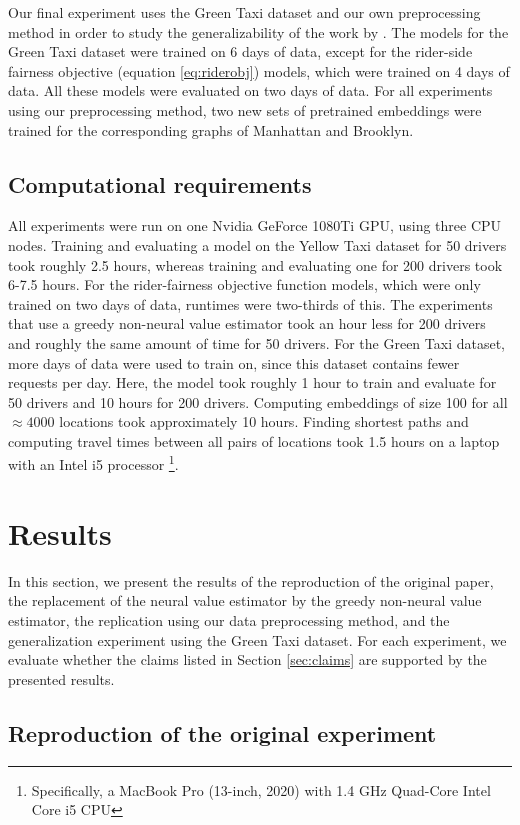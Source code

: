 Our final experiment uses the Green Taxi dataset and our own preprocessing method in order to study the generalizability of the work by \cite{raman_data-driven_2021}. The models for the Green Taxi dataset were trained on 6 days of data, except for the rider-side fairness objective (equation \ref{eq:riderobj}) models, which were trained on 4 days of data. All these models were evaluated on two days of data. For all experiments using our preprocessing method, two new sets of pretrained embeddings were trained for the corresponding graphs of Manhattan and Brooklyn.

\subsection{Computational requirements}
All experiments were run on one Nvidia GeForce 1080Ti GPU, using three CPU nodes. Training and evaluating a model on the Yellow Taxi dataset for 50 drivers took roughly 2.5 hours, whereas training and evaluating one for 200 drivers took 6-7.5 hours. For the rider-fairness objective function models, which were only trained on two days of data, runtimes were two-thirds of this. The experiments that use a greedy non-neural value estimator took an hour less for 200 drivers and roughly the same amount of time for 50 drivers. For the Green Taxi dataset, more days of data were used to train on, since this dataset contains fewer requests per day. Here, the model took roughly 1 hour to train and evaluate for 50 drivers and 10 hours for 200 drivers. Computing embeddings of size 100 for all $\approx 4000$ locations took approximately 10 hours. Finding shortest paths and computing travel times between all pairs of locations took 1.5 hours on a laptop with an Intel i5 processor \footnote{Specifically, a MacBook Pro (13-inch, 2020) with 1.4 GHz Quad-Core Intel Core i5 CPU}.

\section{Results}
\label{sec:results}
In this section, we present the results of the reproduction of the original paper, the replacement of the neural value estimator by the greedy non-neural value estimator, the replication using our data preprocessing method, and the generalization experiment using the Green Taxi dataset. For each experiment, we evaluate whether the claims listed in Section \ref{sec:claims} are supported by the presented results.

\subsection{Reproduction of the original experiment}
\label{subsec:reproduction}

